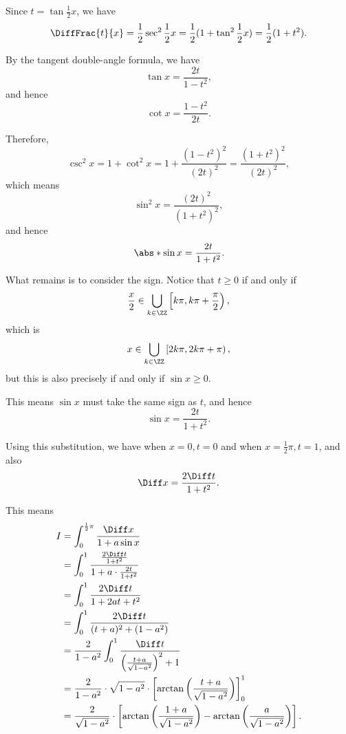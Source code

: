 \Question{\currfilebase}

Since \(t = \tan \frac{1}{2}x\), we have
\[
    \DiffFrac{t}{x} = \frac{1}{2} \sec^2 \frac{1}{2}x = \frac{1}{2} (1 + \tan^2 \frac{1}{2}x) = \frac{1}{2}(1 + t^2).
\]

By the tangent double-angle formula, we have
\[
    \tan x = \frac{2t}{1 - t^2},
\]
and hence
\[
    \cot x = \frac{1 - t^2}{2t}.
\]

Therefore,
\[
    \csc^2 x = 1 + \cot^2 x = 1 + \frac{(1 - t^2)^2}{(2t)^2} = \frac{(1 + t^2)^2}{(2t)^2},
\]
which means
\[
    \sin^2 x = \frac{(2t)^2}{(1 + t^2)^2},
\]
and hence
\[
    \abs*{\sin x} = \frac{2t}{1 + t^2}.
\]

What remains is to consider the sign. Notice that \(t \geq 0\) if and only if
\[
    \frac{x}{2} \in \bigcup_{k \in \ZZ} \left[k\pi, k\pi + \frac{\pi}{2}\right),
\]
which is
\[
    x \in \bigcup_{k \in \ZZ} \left[2k\pi, 2k\pi + \pi\right),
\]
but this is also precisely if and only if \(\sin x \geq 0\).

This means \(\sin x\) must take the same sign as \(t\), and hence
\[
    \sin x = \frac{2t}{1 + t^2}.
\]

Using this substitution, we have when \(x = 0, t = 0\) and when \(x = \frac{1}{2}\pi, t = 1\), and also
\[
    \Diff x = \frac{2 \Diff t}{1 + t^2}.
\]

This means
\begin{align*}
    I & = \int_{0}^{\frac{1}{2}\pi} \frac{\Diff x}{1 + a \sin x}                                                                                       \\
      & = \int_{0}^{1} \frac{\frac{2 \Diff t}{1 + t^2}}{1 + a \cdot \frac{2t}{1 + t^2}}                                                                \\
      & = \int_{0}^{1} \frac{2 \Diff t}{1 + 2at + t^2}                                                                                                 \\
      & = \int_{0}^{1} \frac{2 \Diff t}{(t + a)^2 + (1 - a^2)}                                                                                         \\
      & = \frac{2}{1 - a^2} \int_{0}^{1} \frac{\Diff t}{\left(\frac{t + a}{\sqrt{1 - a^2}}\right)^2 + 1}                                               \\
      & = \frac{2}{1 - a^2} \cdot \sqrt{1 - a^2} \cdot \left[\arctan\left(\frac{t + a}{\sqrt{1 - a^2}}\right)\right]_{0}^{1}                           \\
      & = \frac{2}{\sqrt{1 - a^2}} \cdot \left[\arctan\left(\frac{1 + a}{\sqrt{1 - a^2}}\right) - \arctan\left(\frac{a}{\sqrt{1 - a^2}}\right)\right].
\end{align*}


